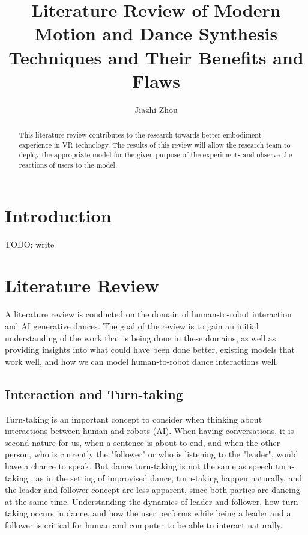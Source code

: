 

\title{Literature Review of Modern Motion and Dance Synthesis Techniques and Their Benefits and Flaws}
\author{Jiazhi Zhou}
\maketitle

\begin{abstract}

This literature review contributes to the research towards better embodiment experience in VR technology. The results of this review will allow the research team to deploy the appropriate model for the given purpose of the experiments and observe the reactions of users to the model.

\end{abstract}

\section{Introduction}

TODO: write

\section{Literature Review}

A literature review is conducted on the domain of human-to-robot
interaction and AI generative dances. The goal of the review is to gain
an initial understanding of the work that is being done in these
domains, as well as providing insights into what could have been done
better, existing models that work well, and how we can model
human-to-robot dance interactions well.

\subsection{Interaction and Turn-taking}

Turn-taking is an important concept to consider when thinking about
interactions between human and robots (AI). When having conversations,
it is second nature for us, when a sentence is about to end, and when
the other person, who is currently the "follower" or who is listening to
the "leader", would have a chance to speak. But dance turn-taking is not
the same as speech turn-taking \cite{Winston2017}, as in the setting of
improvised dance, turn-taking happen naturally, and the leader and
follower concept are less apparent, since both parties are dancing at
the same time. Understanding the dynamics of leader and follower, how
turn-taking occurs in dance, and how the user performs while being a
leader and a follower is critical for human and computer to be able to
interact naturally.

